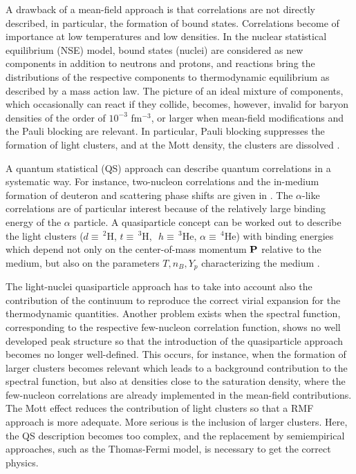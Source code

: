 \documentclass[aps,prc,nofootinbib,twocolumn,showpacs]{revtex4-1}
\begin{document}
A drawback of a mean-field approach is that correlations are not directly
described, in particular, the formation of bound states. Correlations
become of importance at low temperatures and low densities. In the
nuclear statistical equilibrium (NSE) model, bound states (nuclei) are
considered as new components in addition to neutrons and protons, and
reactions bring the distributions of the respective components to
thermodynamic equilibrium as described by a mass action law. The
picture of an ideal mixture of components, which occasionally can
react if they collide, becomes, however, invalid for baryon densities
of the order of $10^{-3}$ fm$^{-3}$, or larger when mean-field modifications 
and the Pauli blocking are relevant. In particular, Pauli blocking suppresses 
the formation of light clusters, and at the Mott density, the clusters are dissolved \cite{RMS}.  

A quantum statistical (QS) approach can describe quantum correlations
in a systematic way. For instance, two-nucleon correlations and the
in-medium formation of deuteron and scattering phase shifts are given
in \cite{SRS}. The $\alpha$-like correlations are of particular
interest because of the relatively large binding energy of the
$\alpha$ particle. A quasiparticle concept can be worked out to
describe the light clusters ($d \equiv\, ^2$H,$\,\, t \equiv \,^3$H,
$\,\,h \equiv \,^3$He,$\,\,\alpha \equiv \, ^4$He) with binding
energies which depend not only on the center-of-mass momentum $\bf P$ relative to the medium,
but also on the parameters $T,n_B,Y_p$ characterizing the medium
\cite{roepke15}.


The light-nuclei quasiparticle approach has to take into account also 
the contribution of the continuum to reproduce the correct virial expansion 
for the thermodynamic quantities. Another problem exists when the spectral function, corresponding to the respective few-nucleon correlation function, 
shows no well developed peak structure so that the introduction of the 
quasiparticle approach becomes no longer well-defined.  This occurs, for instance, when the formation of larger clusters becomes relevant which leads to a background contribution to the spectral function,
but also at densities close to the saturation density, where the few-nucleon correlations are already implemented  in the mean-field contributions. The Mott effect reduces the contribution of light clusters so that a RMF approach is more adequate. More serious is the inclusion of larger clusters. Here, the QS description becomes too complex, and the replacement by semiempirical approaches, such as the Thomas-Fermi model, is necessary to get the correct physics. 
\end{document}
